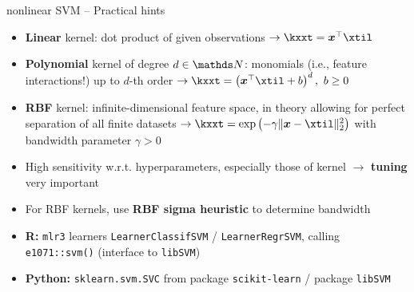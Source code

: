 
\begin{frame}{nonlinear SVM -- Practical hints}

\footnotesize


\begin{itemize}
  \item \textbf{Linear} kernel: dot product of given observations $\rightarrow 
  \kxxt = \xv^\top \xtil$
  \item \textbf{Polynomial} kernel of degree $d \in \N$: monomials (i.e., 
  feature interactions!) up to $d$-th 
  order $\rightarrow 
  \kxxt = \left(\xv^\top \xtil + b \right)^d, ~ b \geq 0$
  \item \textbf{RBF} kernel: infinite-dimensional 
  feature space, in theory allowing for perfect separation of all finite 
  datasets $\rightarrow \kxxt = \exp \left( -\gamma \| \xv - \xtil \|_2^2 
  \right )$ with 
  bandwidth parameter $\gamma > 0$
\end{itemize}
 
\medskip

 
 \begin{itemize}
  \item High sensitivity w.r.t. hyperparameters, especially those of kernel
  $\rightarrow$ \textbf{tuning} very important
  \item For RBF kernels, use \textbf{RBF sigma heuristic} to determine 
  bandwidth
\end{itemize}

  \medskip

\begin{itemize}
  \item \textbf{R:} \texttt{mlr3} learners \texttt{LearnerClassifSVM} /
  \texttt{LearnerRegrSVM}, calling \texttt{e1071::svm()} (interface to 
  \texttt{libSVM})
  \item \textbf{Python:} \texttt{sklearn.svm.SVC} from package 
  \texttt{scikit-learn} / package \texttt{libSVM}
\end{itemize}

\end{frame}